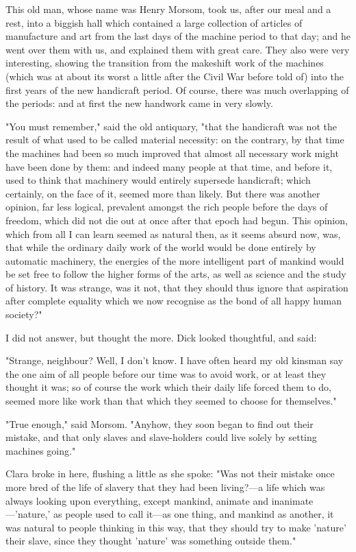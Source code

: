 This old man, whose name was Henry Morsom, took us, after our meal and a
rest, into a biggish hall which contained a large collection of articles
of manufacture and art from the last days of the machine period to that
day; and he went over them with us, and explained them with great care.
They also were very interesting, showing the transition from the
makeshift work of the machines (which was at about its worst a little
after the Civil War before told of) into the first years of the new
handicraft period. Of course, there was much overlapping of the periods:
and at first the new handwork came in very slowly.

"You must remember," said the old antiquary, "that the handicraft was
not the result of what used to be called material necessity: on the
contrary, by that time the machines had been so much improved that
almost all necessary work might have been done by them: and indeed many
people at that time, and before it, used to think that machinery would
entirely supersede handicraft; which certainly, on the face of it,
seemed more than likely. But there was another opinion, far less
logical, prevalent amongst the rich people before the days of freedom,
which did not die out at once after that epoch had begun. This opinion,
which from all I can learn seemed as natural then, as it seems absurd
now, was, that while the ordinary daily work of the world would be done
entirely by automatic machinery, the energies of the more intelligent
part of mankind would be set free to follow the higher forms of the
arts, as well as science and the study of history. It was strange, was
it not, that they should thus ignore that aspiration after complete
equality which we now recognise as the bond of all happy human society?"

I did not answer, but thought the more. Dick looked thoughtful, and
said:

"Strange, neighbour? Well, I don't know. I have often heard my old
kinsman say the one aim of all people before our time was to avoid work,
or at least they thought it was; so of course the work which their daily
life forced them to do, seemed more like work than that which they
seemed to choose for themselves."

"True enough," said Morsom. "Anyhow, they soon began to find out their
mistake, and that only slaves and slave-holders could live solely by
setting machines going."

Clara broke in here, flushing a little as she spoke: "Was not their
mistake once more bred of the life of slavery that they had been
living?---a life which was always looking upon everything, except
mankind, animate and inanimate---'nature,' as people used to call
it---as one thing, and mankind as another, it was natural to people
thinking in this way, that they should try to make 'nature' their slave,
since they thought 'nature' was something outside them."

